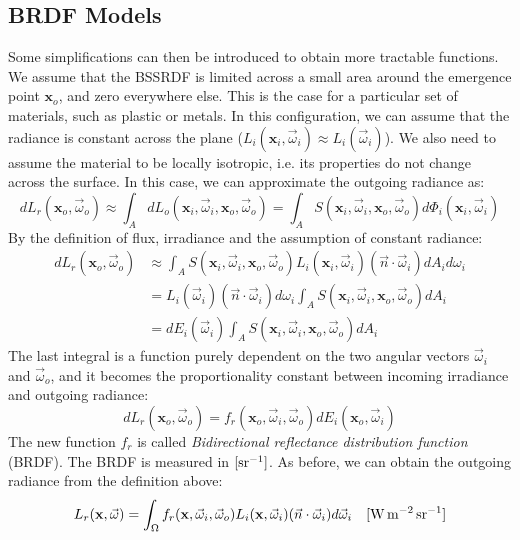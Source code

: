 \subsection{BRDF Models}

Some simplifications can then be introduced to obtain more tractable functions. We assume that the BSSRDF is limited across a small area around the emergence point $\mathbf{x}_o$, and zero everywhere else. This is the case for a particular set of materials, such as plastic or metals. In this configuration, we can assume that the radiance is constant across the plane ($L_i(\mathbf{x}_i, \vec{\omega}_i) \approx L_i(\vec{\omega}_i)$). We also need to assume the material to be locally isotropic, i.e. its properties do not change across the surface. In this case, we can approximate the outgoing radiance as:
\begin{equation*}
d L_r(\mathbf{x}_o, \vec{\omega}_o) \approx \int_A d L_o(\mathbf{x}_i, \vec{\omega}_i, \mathbf{x}_o, \vec{\omega}_o) = \int_A S(\mathbf{x}_i, \vec{\omega}_i, \mathbf{x}_o, \vec{\omega}_o) d \Phi_i(\mathbf{x}_i, \vec{\omega}_i) 
\end{equation*}
By the definition of flux, irradiance and the assumption of constant radiance:
\begin{equation*}
\begin{split}
d L_r(\mathbf{x}_o, \vec{\omega}_o) &\approx \int_A S(\mathbf{x}_i, \vec{\omega}_i, \mathbf{x}_o, \vec{\omega}_o) L_i(\mathbf{x}_i, \vec{\omega}_i) (\vec{n} \cdot \vec{\omega}_i) d A_i d \omega_i  \\ &= L_i(\vec{\omega}_i) (\vec{n} \cdot \vec{\omega}_i) d \omega_i \int_A S(\mathbf{x}_i, \vec{\omega}_i, \mathbf{x}_o, \vec{\omega}_o)   d A_i \\ &= d E_i(\vec{\omega}_i) \int_A S(\mathbf{x}_i, \vec{\omega}_i, \mathbf{x}_o, \vec{\omega}_o) d A_i
\end{split}
\end{equation*}
The last integral is a function purely dependent on the two angular vectors $\vec{\omega}_i$ and $\vec{\omega}_o$, and it becomes the proportionality constant between incoming irradiance and outgoing radiance:
\begin{equation*}
d L_r(\mathbf{x}_o, \vec{\omega}_o) = f_r(\mathbf{x}_o, \vec{\omega}_i, \vec{\omega}_o) d E_i(\mathbf{x}_o, \vec{\omega}_i)
\end{equation*}
 The new function $f_r$ is called \emph{Bidirectional reflectance distribution function} (BRDF). The BRDF is measured in $\siunitnospace{\per \steradian}$. As before, we can obtain the outgoing radiance from the definition above:
\begin{equation*}
L_r(\mathbf{x}, \vec{\omega}) = \int_\Omega f_r(\mathbf{x}, \vec{\omega}_i,  \vec{\omega}_o) L_i(\mathbf{x}, \vec{\omega}_i) (\vec{n} \cdot \vec{\omega}_i) d\vec{\omega}_i  \siunit{\watt \per \square \metre \per \steradian}
\end{equation*}

